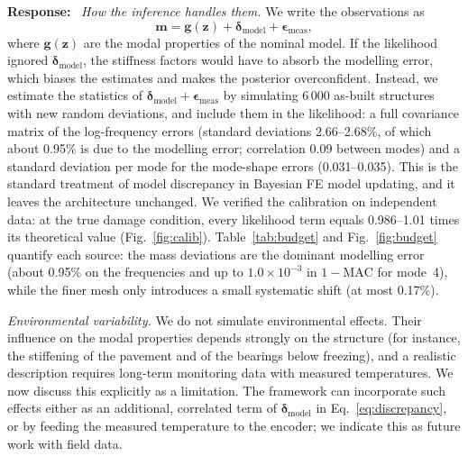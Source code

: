 \documentclass[11pt]{article}
\newenvironment{response}{\par\smallskip\noindent\color{resp}\textbf{Response:}\ }{\par}
\newcommand{\m}{\mathbf{m}}
\newcommand{\z}{\mathbf{z}}
\begin{document}
\begin{response}
\textit{How the inference handles them.} We write the observations as
\begin{equation}
\m=\mathbf{g}(\z)+\bm{\delta}_{\mathrm{model}}+\bm{\epsilon}_{\mathrm{meas}},
\label{eq:discrepancy}
\end{equation}
where $\mathbf{g}(\z)$ are the modal properties of the nominal model. If the likelihood ignored
$\bm{\delta}_{\mathrm{model}}$, the stiffness factors would have to absorb the modelling error, which biases the
estimates and makes the posterior overconfident. Instead, we estimate the statistics of
$\bm{\delta}_{\mathrm{model}}+\bm{\epsilon}_{\mathrm{meas}}$ by simulating 6\,000 as-built structures with new random
deviations, and include them in the likelihood: a full covariance matrix of the log-frequency errors (standard
deviations 2.66--2.68\%, of which about 0.95\% is due to the modelling error; correlation 0.09 between modes) and a
standard deviation per mode for the mode-shape errors (0.031--0.035). This is the standard treatment of model
discrepancy in Bayesian FE model updating, and it leaves the architecture unchanged. We verified the calibration on
independent data: at the true damage condition, every likelihood term equals 0.986--1.01 times its theoretical value
(Fig.~\ref{fig:calib}). Table~\ref{tab:budget} and Fig.~\ref{fig:budget} quantify each source: the mass deviations are
the dominant modelling error (about 0.95\% on the frequencies and up to $1.0\times10^{-3}$ in $1-\mathrm{MAC}$ for
mode~4), while the finer mesh only introduces a small systematic shift (at most 0.17\%).

\textit{Environmental variability.} We do not simulate environmental effects. Their influence on the modal properties
depends strongly on the structure (for instance, the stiffening of the pavement and of the bearings below freezing), and
a realistic description requires long-term monitoring data with measured temperatures. We now discuss this explicitly
as a limitation. The framework can incorporate such effects either as an additional, correlated term of
$\bm{\delta}_{\mathrm{model}}$ in Eq.~\eqref{eq:discrepancy}, or by feeding the measured temperature to the encoder; we
indicate this as future work with field data.
\end{response}
\end{document}
